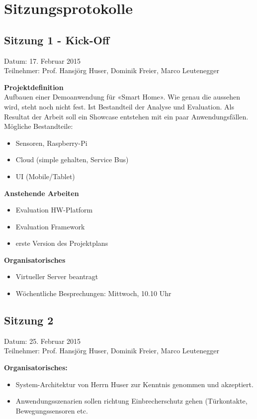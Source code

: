 \chapter{Sitzungsprotokolle}
\label{chap:Sitzungsprotokolle}
\section*{Sitzung 1 - Kick-Off}
Datum: 17. Februar 2015 \\
Teilnehmer: Prof. Hansjörg Huser, Dominik Freier, Marco Leutenegger

\textbf{Projektdefinition} \\
Aufbauen einer Demoanwendung für «Smart Home». Wie genau die aussehen wird, steht noch nicht fest. Ist Bestandteil der Analyse und Evaluation. Als Resultat der Arbeit soll ein Showcase entstehen mit ein paar Anwendungsfällen. \\
Mögliche Bestandteile:
\begin{itemize}
	\item Sensoren, Raspberry-Pi
	\item Cloud (simple gehalten, Service Bus)
	\item UI (Mobile/Tablet)
\end{itemize}

\textbf{Anstehende Arbeiten}
\begin{itemize}
	\item Evaluation HW-Platform
	\item Evaluation Framework
	\item erste Version des Projektplans
\end{itemize}

\textbf{Organisatorisches}

\begin{itemize}
	\item Virtueller Server beantragt
	\item Wöchentliche Besprechungen: Mittwoch, 10.10 Uhr
\end{itemize}

\section*{Sitzung 2}
Datum: 25. Februar 2015 \\
Teilnehmer: Prof. Hansjörg Huser, Dominik Freier, Marco Leutenegger

\textbf{Organisatorisches:}
\begin{itemize}
	\item System-Architektur von Herrn Huser zur Kenntnis genommen und akzeptiert.
	\item Anwendungsszenarien sollen richtung Einbrecherschutz gehen (Türkontakte, Bewegungssensoren etc.
\end{itemize}


